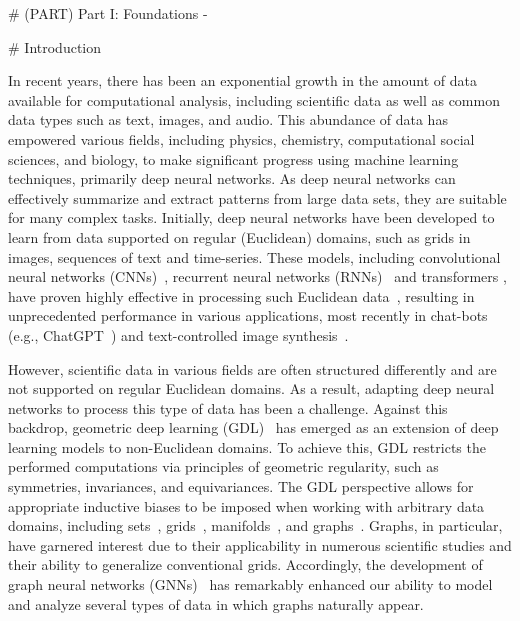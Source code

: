 \mainmatter

# (PART\*) Part I: Foundations {-}

# Introduction

In recent years, there has been an exponential growth in the amount of data available for computational analysis, including scientific data as well as common data types such as text, images, and audio. This abundance of data has empowered various fields, including physics, chemistry, computational social sciences, and biology, to make significant progress using machine learning techniques, primarily deep neural networks. As deep neural networks can effectively summarize and extract patterns from large data sets, they are suitable for many complex tasks. Initially, deep neural networks have been developed to learn from data supported on regular (Euclidean) domains,
such as grids in images, sequences of text and time-series. These models, including convolutional neural networks (CNNs)~\cite{krizhevsky2012imagenet,lecun1998gradient,simonyan2014very}, recurrent neural networks (RNNs)~\cite{sutskever2014sequence,bahdanau2014neural} and transformers \cite{vaswani2017attention}, have proven highly effective in processing such Euclidean data~\cite{goodfellow2016deep}, resulting in unprecedented performance in various applications, most recently in chat-bots (e.g., ChatGPT~\cite{adesso2022gpt4}) and text-controlled image synthesis~\cite{rombach2022high}.

However, scientific data in various fields are often structured differently and are not supported on regular Euclidean domains. As a result, adapting deep neural networks to process this type of data has been a challenge. Against this backdrop, geometric deep learning (GDL)~\cite{bronstein2021geometric,zhou2020graph,wu2020comprehensive} has emerged as an extension of deep learning models to non-Euclidean domains. To achieve this, GDL restricts the performed computations via principles of geometric regularity, such as symmetries, invariances, and equivariances. The GDL perspective allows for appropriate inductive biases to be imposed when working with arbitrary data domains, including sets~\cite{qi2017pointnet,rempe2020caspr,deng2018ppfnet,zhao20223dpointcaps++,huang2022multiway}, grids~\cite{boscaini2015learning,masci2015geodesic,boscaini2016learning,kokkinos2012intrinsic,shuman2016vertex,wu20153d,monti2017geometric}, manifolds~\cite{boscaini2015learning,masci2015geodesic,boscaini2016learning,kokkinos2012intrinsic,shuman2016vertex,wu20153d,monti2017geometric}, and graphs~\cite{scarselli2008graph,gallicchio2010graph,zhou2020graph,wu2020comprehensive,boscaini2016learning,monti2017geometric,bronstein2017geometric,kipf2016semi}. 
Graphs, in particular, have garnered interest due to their applicability in numerous scientific studies and their ability to generalize conventional grids. Accordingly, the development of graph neural networks (GNNs)~\cite{bronstein2017geometric,kipf2016semi} has remarkably enhanced our ability to model and analyze several types of data in which graphs naturally appear.

